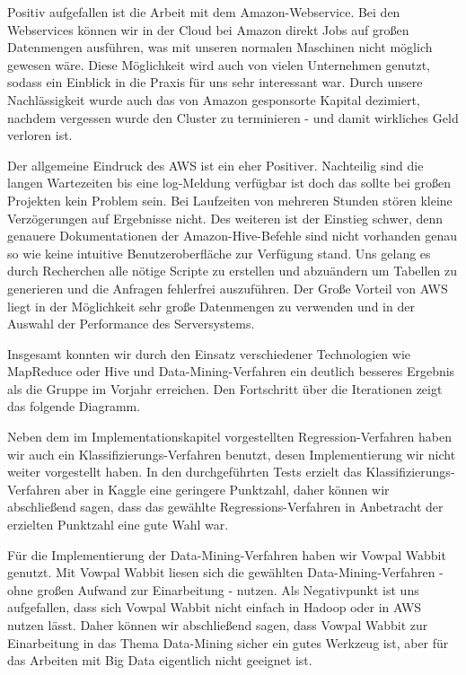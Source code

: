 Positiv aufgefallen ist die Arbeit mit dem Amazon-Webservice. Bei den Webservices können wir in der Cloud bei Amazon direkt Jobs auf großen Datenmengen ausführen, was mit unseren normalen Maschinen nicht möglich gewesen wäre. Diese Möglichkeit wird auch von vielen Unternehmen genutzt, sodass ein Einblick in die Praxis für uns sehr interessant war. Durch unsere Nachlässigkeit wurde auch das von Amazon gesponsorte Kapital dezimiert, nachdem vergessen wurde den Cluster zu terminieren - und damit wirkliches Geld verloren ist.


Der allgemeine Eindruck des AWS ist ein eher Positiver. Nachteilig sind die langen Wartezeiten bis eine log-Meldung verfügbar ist doch das sollte bei großen Projekten kein Problem sein. Bei Laufzeiten von mehreren Stunden stören kleine Verzögerungen auf Ergebnisse nicht. Des weiteren ist der Einstieg schwer, denn genauere Dokumentationen der Amazon-Hive-Befehle sind nicht vorhanden genau so wie keine intuitive Benutzeroberfläche zur Verfügung stand. Uns gelang es durch Recherchen alle nötige Scripte zu erstellen und abzuändern um Tabellen zu generieren und die Anfragen fehlerfrei auszuführen. Der Große Vorteil von AWS liegt in der Möglichkeit sehr große Datenmengen zu verwenden und in der  Auswahl der Performance des Serversystems. 
 


Insgesamt konnten wir durch den Einsatz verschiedener Technologien wie MapReduce oder Hive und Data-Mining-Verfahren ein deutlich besseres Ergebnis als die Gruppe im Vorjahr erreichen. Den Fortschritt über die Iterationen zeigt das folgende Diagramm.

Neben dem im Implementationskapitel vorgestellten Regression-Verfahren haben wir auch ein Klassifizierungs-Verfahren benutzt,
desen Implementierung wir nicht weiter vorgestellt haben. In den durchgeführten Tests erzielt das Klassifizierungs-Verfahren
aber in Kaggle eine geringere Punktzahl, daher können wir abschließend sagen, dass das gewählte Regressions-Verfahren in
Anbetracht der erzielten Punktzahl eine gute Wahl war.

Für die Implementierung der Data-Mining-Verfahren haben wir Vowpal Wabbit genutzt. Mit Vowpal Wabbit liesen sich die
gewählten Data-Mining-Verfahren - ohne großen Aufwand zur Einarbeitung - nutzen. Als Negativpunkt ist uns aufgefallen, dass
sich Vowpal Wabbit nicht einfach in Hadoop oder in AWS nutzen lässt. Daher können wir abschließend sagen, dass Vowpal Wabbit
zur Einarbeitung in das Thema Data-Mining sicher ein gutes Werkzeug ist, aber für das Arbeiten mit Big Data eigentlich nicht
geeignet ist.

